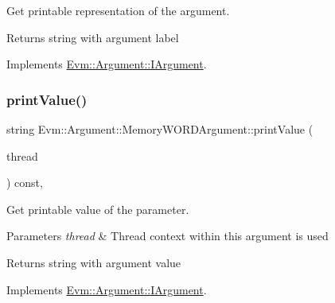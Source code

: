 Get printable representation of the argument. 

\begin{DoxyReturn}{Returns}
string with argument label 
\end{DoxyReturn}


Implements \mbox{\hyperlink{struct_evm_1_1_argument_1_1_i_argument_a35bdae816e89f6f9fc393b6e03c5e521}{Evm\+::\+Argument\+::\+I\+Argument}}.

\mbox{\label{struct_evm_1_1_argument_1_1_memory_w_o_r_d_argument_ac8c383d86bde6ef724583560bd0436e0}} 
\subsubsection{\texorpdfstring{print\+Value()}{printValue()}}
{\footnotesize\ttfamily string Evm\+::\+Argument\+::\+Memory\+W\+O\+R\+D\+Argument\+::print\+Value (\begin{DoxyParamCaption}\item[{\mbox{\hyperlink{struct_evm_1_1_thread_context}{Thread\+Context}} \&}]{thread }\end{DoxyParamCaption}) const\hspace{0.3cm}{\ttfamily [override]}, {\ttfamily [virtual]}}



Get printable value of the parameter. 


\begin{DoxyParams}{Parameters}
{\em thread} & Thread context within this argument is used \\
\hline
\end{DoxyParams}
\begin{DoxyReturn}{Returns}
string with argument value 
\end{DoxyReturn}


Implements \mbox{\hyperlink{struct_evm_1_1_argument_1_1_i_argument_afcab2d2a1515518a111881a635c83da3}{Evm\+::\+Argument\+::\+I\+Argument}}.

\mbox{\label{struct_evm_1_1_argument_1_1_memory_w_o_r_d_argument_a9572abaa123939edd7c724074ac3b7ec}} 
